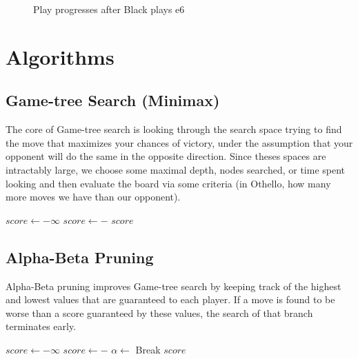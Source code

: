 \documentclass[]{article}
\begin{document}
\begin{figure}
  \caption{Play progresses after Black plays e6}
  \centering
  \newgame
{}
\showboard
\end{figure}

\section{Algorithms}
\subsection{Game-tree Search (Minimax)}
The core of Game-tree search is looking through the search space trying to find the move that maximizes
your chances of victory, under the assumption that your opponent will do the same in the opposite direction.
Since theses spaces are intractably large, we choose some maximal depth, nodes searched, or time spent looking
and then evaluate the board via some criteria (in Othello, how many more moves we have than our opponent).
\begin{algorithmic}[1]
  \State \Return {}
  \Else
  \State $score \gets -\infty$
  \State $score \gets -$ 
  \EndFor
  \State \Return $score$
  \EndIf
  \EndProcedure
\end{algorithmic}
\subsection{Alpha-Beta Pruning}
Alpha-Beta pruning improves Game-tree search by keeping track of the highest and lowest values that
are guaranteed to each player. If a move is found to be worse than a score guaranteed by these values, the search
of that branch terminates early.
\begin{algorithmic}[1]
  \State \Return {}
  \Else
  \State $score \gets -\infty$
  \State $score \gets -$ 
  \State $\alpha \gets $ 
  \If{$\alpha \geq \beta$}
  \State Break
  \EndIf
  \EndFor
  \State \Return $score$
  \EndIf
  \EndProcedure
\end{algorithmic}
\end{document}
